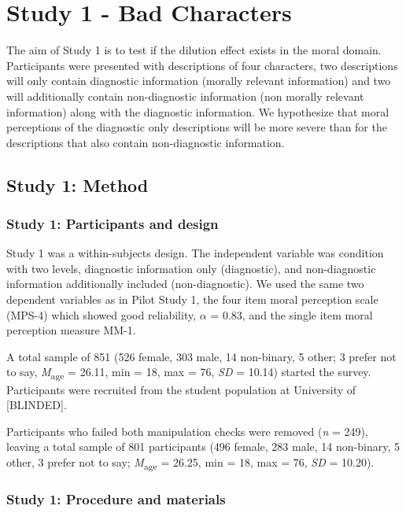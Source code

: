 \documentclass[
  man,floatsintext]{apa6}
\begin{document}
\section{Study 1 - Bad Characters}\label{study-1---bad-characters}

The aim of Study 1 is to test if the dilution effect exists in the moral domain. Participants were presented with descriptions of four characters, two descriptions will only contain diagnostic information (morally relevant information) and two will additionally contain non-diagnostic information (non morally relevant information) along with the diagnostic information. We hypothesize that moral perceptions of the diagnostic only descriptions will be more severe than for the descriptions that also contain non-diagnostic information.

\subsection{Study 1: Method}\label{study-1-method}

\subsubsection{Study 1: Participants and design}\label{study-1-participants-and-design}

Study 1 was a within-subjects design. The independent variable was condition with two levels, diagnostic information only (diagnostic), and non-diagnostic information additionally included (non-diagnostic). We used the same two dependent variables as in Pilot Study 1, the four item moral perception scale (MPS-4) which showed good reliability, \(\alpha\) = 0.83, and the single item moral perception measure MM-1.

A total sample of 851 (526 female, 303 male, 14 non-binary, 5 other; 3 prefer not to say, \emph{M}\textsubscript{age} = 26.11, min = 18, max = 76, \emph{SD} = 10.14) started the survey. Participants were recruited from the student population at University of {[}BLINDED{]}.

Participants who failed both manipulation checks were removed (\emph{n} = 249), leaving a total sample of 801 participants (496 female, 283 male, 14 non-binary, 5 other, 3 prefer not to say; \emph{M}\textsubscript{age} = 26.25, min = 18, max = 76, \emph{SD} = 10.20).

\subsubsection{Study 1: Procedure and materials}\label{study-1-procedure-and-materials}
\end{document}
